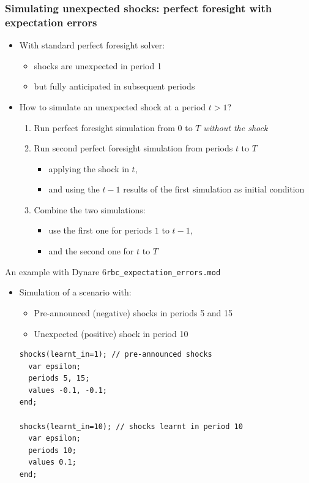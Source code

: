 \documentclass[handout,usepdftitle=false,xcolor=dvipsnames,aspectratio=169]{beamer}
\begin{document}
\begin{frame}
  \frametitle{Simulating unexpected shocks: perfect foresight with expectation errors}
  \begin{itemize}
    \item   With standard perfect foresight solver:
          \begin{itemize}
            \item shocks are unexpected in period 1
            \item but fully anticipated in subsequent periods
          \end{itemize}
          \bigskip
    \item How to simulate an unexpected shock at a period $t > 1$?
          \begin{enumerate}
            \item Run perfect foresight simulation from $0$ to $T$ \emph{without the
                    shock}
            \item Run second perfect foresight simulation from periods $t$ to $T$
                  \begin{itemize}
                    \item applying the shock in $t$,
                    \item and using the $t-1$ results of the first simulation as initial condition
                  \end{itemize}
            \item Combine the two simulations:
                  \begin{itemize}
                    \item use the first one for periods $1$ to $t-1$,
                    \item and the second one for $t$ to $T$
                  \end{itemize}
          \end{enumerate}
  \end{itemize}
\end{frame}

\begin{frame}[fragile]{An example with Dynare 6}{\texttt{rbc\_expectation\_errors.mod}}
  \begin{itemize}
    \item Simulation of a scenario with:
          \begin{itemize}
            \item Pre-announced (negative) shocks in periods 5 and 15
            \item Unexpected (positive) shock in period 10
          \end{itemize}


          \begin{verbatim}
shocks(learnt_in=1); // pre-announced shocks
  var epsilon;
  periods 5, 15;
  values -0.1, -0.1;
end;

shocks(learnt_in=10); // shocks learnt in period 10
  var epsilon;
  periods 10;
  values 0.1;
end;
\end{verbatim}
  \end{itemize}
\end{frame}
\end{document}
